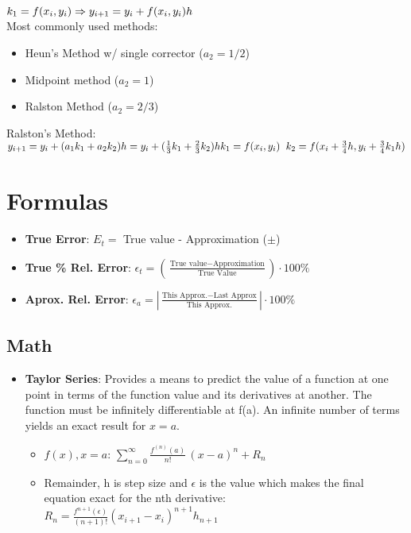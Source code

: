 \documentclass[fontsize=5pt]{scrartcl}
\begin{document}
\begin{multicols}{3}
\begin{enumerate}
\begin{math}
           k_1=f(x_i,y_i) \Rightarrow y_{i+1}=y_i+f(x_i,y_i)h\\
         \end{math}\\
         Most commonly used methods:
         \begin{itemize}
           \item Heun's Method w/ single corrector ($a_2=1/2$)
           \item Midpoint method ($a_2=1$)
           \item Ralston Method ($a_2=2/3$)
         \end{itemize}
         Ralston's Method:\\
         \begin{math}
           y_{i+1}=y_i+(a_1k_1+a_2k_2)h=y_i+(\frac{1}{3}k_1+\frac{2}{3}k_2)h\\
           k_1=f(x_i,y_i)\hspace{2mm}k_2=f(x_i+\frac{3}{4}h,y_i+\frac{3}{4}k_1h)
         \end{math}





    \end{enumerate}
    
  \section{Formulas}
      \begin{itemize}
        \item \textbf{True Error}: $E_t =$ True value - Approximation ($\pm$)
        \item \textbf{True \% Rel. Error}: $\epsilon_t = (\frac{\text{True value} - \text{Approximation}}{\text{True Value}})\cdot100\%$
        \item \textbf{Aprox. Rel. Error}: $\epsilon_a =  |\frac{\text{This Approx.} - \text{Last Approx}}{\text{This Approx.}}|\cdot100\%$
      \end{itemize}
      
    \subsection{Math}
      \begin{itemize}
      \item \textbf{Taylor Series}: Provides a means to predict the value of a function at one point in terms of
             the function value and its derivatives at another. The function must be infinitely differentiable
             at f(a). An infinite number of terms yields an exact result for $x=a$.
        \begin{itemize}
          \item $f(x), x=a$: $\sum_{n=0} ^ {\infty} \frac {f^{(n)}(a)}{n!} \, (x-a)^{n} + R_n$
          \item Remainder, h is step size and $\epsilon$ is the value which makes the final
          equation exact for the nth derivative: \\ $R_n = \frac{f^{n+1}(\epsilon)}{(n+1)!} (x_{i+1}-x_i)^{n+1}h_{n+1}$ \\
          

\end{itemize}
\end{itemize}
\end{multicols}
\end{document}
